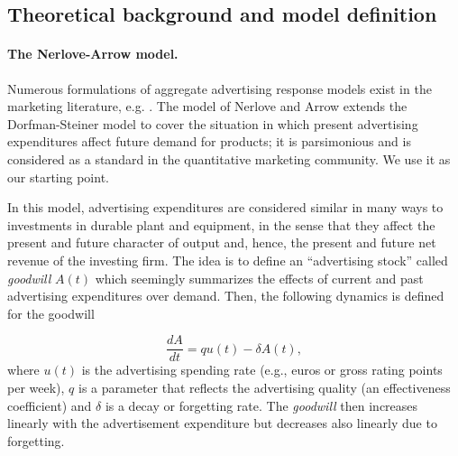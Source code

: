


\subsection{Theoretical background and model definition}


\paragraph{The Nerlove-Arrow model.}


Numerous formulations of aggregate advertising response models exist in the marketing literature, e.g. \cite{little1979aggregate}. The model of Nerlove and Arrow \cite{nerlove1962optimal} extends the Dorfman-Steiner model to cover the situation in which present advertising expenditures affect future demand for products; it is parsimonious and is considered as a standard in the quantitative marketing community. We use it as our starting point.

In this model, advertising expenditures are considered similar in many ways to investments in durable plant and equipment, in the sense that they affect the present and future character of output and, hence, the present and future net revenue of the investing firm. The idea is to define an ``advertising stock'' called \emph{goodwill}  $A(t)$ which seemingly summarizes the effects of current and past advertising expenditures over demand. Then, the following dynamics is defined for the goodwill

\begin{equation}\label{eq:NA}
\frac{dA}{dt} = qu(t) - \delta A(t),
\end{equation}
where $u(t)$ is the advertising spending rate (e.g., euros or gross rating points per week), $q$ is a parameter that reflects the advertising quality (an effectiveness coefficient) and $\delta$ is a decay or forgetting rate. The \emph{goodwill} then increases linearly with the advertisement expenditure but decreases also linearly due to forgetting. %

